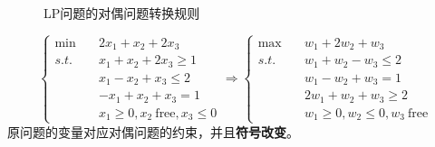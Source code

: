 \begin{remark}
\begin{itemize}
\begin{figure}[htbp]
            \caption{LP问题的对偶问题转换规则 \label{fig2}}
        \end{figure}
        \[\begin{cases}
            \min \quad & 2x_1 + x_2 + 2x_3\\
            s.t. \quad & x_1 + x_2 + 2x_3 \ge 1\\
            &x_1 - x_2 + x_3 \le 2\\
            &-x_1 + x_2 + x_3 = 1\\
            &x_1 \ge 0, x_2 \ \text{free}, x_3 \le 0
        \end{cases} \Longrightarrow \begin{cases}
            \max \quad & w_1 + 2w_2 + w_3\\
            s.t. \quad & w_1 + w_2 - w_3 \le 2\\
            &w_1 - w_2 + w_3 = 1\\
            &2w_1 + w_2 + w_3 \ge 2\\
            &w_1 \ge 0, w_2 \le 0, w_3 \ \text{free}
        \end{cases}\]
        原问题的变量对应对偶问题的约束，并且\textbf{符号改变}。
    \end{itemize}
\end{remark}


